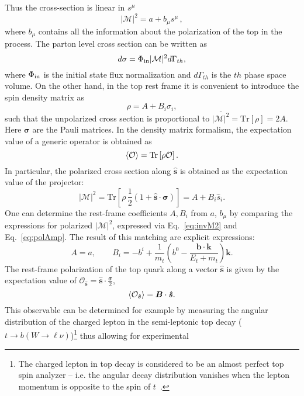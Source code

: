 \documentclass[11pt,a4paper]{article}
\newcommand{\mc}[1]{\mathcal{#1}}
\newcommand{\mrm}[1]{\mathrm{#1}}
\newcommand{\amp}{\mathcal{M}}
\newcommand{\hvec}[1]{\bm{\hat #1}}
\begin{document}
Thus the cross-section is linear in $s^\mu$
\begin{equation}
\label{eq:invM2}
|\amp|^2 = a + b_\mu s^\mu\,,
\end{equation}
where $b_\mu$ contains all the information about the polarization of the
top in the process. The parton level cross section can be written as
\begin{equation}
d \sigma = \Phi_{\rm in} |\amp|^2 d\Gamma_{th},
\end{equation}
where $\Phi_{\rm in}$ is the initial state flux normalization and
$d\Gamma_{th}$ is the $th$ phase space volume. On the other
hand, in the top rest frame it is convenient to introduce the spin
density matrix as
\begin{equation}
\label{eq:Rho}
\rho = A  + B_i \sigma_i,
\end{equation}
such that the unpolarized cross section is proportional to
$\overline{|\amp|^2} = \mrm{Tr}[\rho] = 2A$.  Here $\bm{\sigma}$ are
the Pauli matrices. In the density matrix formalism, the expectation
value of a generic operator is obtained as
\begin{equation}
\Braket{\mc{O}} = \mathrm{Tr} \left[\rho \mc{O} \right].
\end{equation}
In particular, the polarized cross section along $\hvec{s}$ is obtained as the
expectation value of the projector:
\begin{equation}
\label{eq:polAmp}
|\amp|^2 = \mathrm{Tr} \left[\rho\,\frac{1}{2} (1+\hvec{s} \cdot \bm{\sigma})\right] = A + B_i \hat{s}_i.
\end{equation}
One can determine the rest-frame coefficients $A, B_i$ from $a$,
$b_\mu$ by comparing the expressions for polarized $|\amp|^2$, expressed via
Eq.~\eqref{eq:invM2} and Eq.~\eqref{eq:polAmp}. The result of this matching are explicit expressions:
\begin{equation}
\label{eq:ABfromab}
A = a,\qquad B_i = -b^i + \frac{1}{m_t}\left(b^0-\frac{\bm{b}\cdot \bm{k}}{E_t + m_t}\right) \bm{k}.
\end{equation}
The rest-frame polarization of the top quark along a vector $\hvec{s}$ is given by the expectation value of $\mc{O}_{\hvec{s}} = \hvec{s}\cdot \frac{\bm{\sigma}}{2}$,
\begin{equation}
\Braket{\mc{O}_{\hvec{s}}} = \bm{B}\cdot \hvec{s}.
\end{equation}
This observable can be determined for example by measuring the angular distribution of the charged lepton in the
semi-leptonic top decay ($t \to b (W \to \ell \nu)$)\footnote{The charged lepton in top decay is considered to be an almost perfect top spin
	analyzer --  i.e. the angular decay distribution vanishes when the lepton momentum is opposite to the spin of $t$~\cite{Atwood:2000tu}.}  thus allowing for experimental
\end{document}
